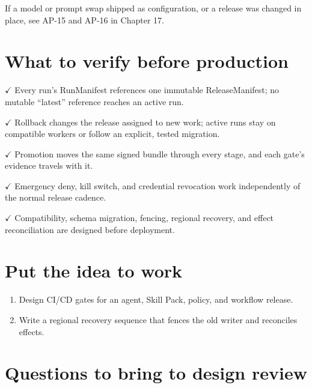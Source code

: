If a model or prompt swap shipped as configuration, or a release was changed in place, see AP-15 and AP-16 in Chapter 17.\par

\section{What to verify before production}

\textbf{\ensuremath{\checkmark}} Every run's RunManifest references one immutable ReleaseManifest; no mutable “latest” reference reaches an active run.\par

\textbf{\ensuremath{\checkmark}} Rollback changes the release assigned to new work; active runs stay on compatible workers or follow an explicit, tested migration.\par

\textbf{\ensuremath{\checkmark}} Promotion moves the same signed bundle through every stage, and each gate's evidence travels with it.\par

\textbf{\ensuremath{\checkmark}} Emergency deny, kill switch, and credential revocation work independently of the normal release cadence.\par

\textbf{\ensuremath{\checkmark}} Compatibility, schema migration, fencing, regional recovery, and effect reconciliation are designed before deployment.\par

\section{Put the idea to work}

\begin{enumerate}

\item Design CI/CD gates for an agent, Skill Pack, policy, and workflow release.

\item Write a regional recovery sequence that fences the old writer and reconciles effects.

\end{enumerate}

\section{Questions to bring to design review}

